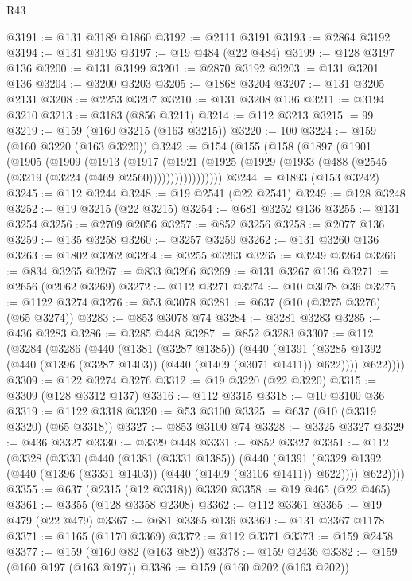 \begin{lexlean}{R43}
\begin{coremodule}
@3191 := @131 @3189 @1860
@3192 := @2111 @3191
@3193 := @2864 @3192
@3194 := @131 @3193
@3197 := @19 @484 (@22 @484)
@3199 := @128 @3197 @136
@3200 := @131 @3199
@3201 := @2870 @3192
@3203 := @131 @3201 @136
@3204 := @3200 @3203
@3205 := @1868 @3204
@3207 := @131 @3205 @2131
@3208 := @2253 @3207
@3210 := @131 @3208 @136
@3211 := @3194 @3210
@3213 := @3183 (@856 @3211)
@3214 := @112 @3213
@3215 := 99
@3219 := @159 (@160 @3215 (@163 @3215))
@3220 := 100
@3224 := @159 (@160 @3220 (@163 @3220))
@3242 := @154
    (@155
      (@158
        (@1897
          (@1901
            (@1905
              (@1909
                (@1913
                  (@1917
                    (@1921
                      (@1925 (@1929 (@1933 (@488 (@2545 (@3219 (@3224 (@469 @2560)))))))))))))))))
@3244 := @1893 (@153 @3242)
@3245 := @112 @3244
@3248 := @19 @2541 (@22 @2541)
@3249 := @128 @3248
@3252 := @19 @3215 (@22 @3215)
@3254 := @681 @3252 @136
@3255 := @131 @3254
@3256 := @2709 @2056
@3257 := @852 @3256
@3258 := @2077 @136
@3259 := @135 @3258
@3260 := @3257 @3259
@3262 := @131 @3260 @136
@3263 := @1802 @3262
@3264 := @3255 @3263
@3265 := @3249 @3264
@3266 := @834 @3265
@3267 := @833 @3266
@3269 := @131 @3267 @136
@3271 := @2656 (@2062 @3269)
@3272 := @112 @3271
@3274 := @10 @3078 @36
@3275 := @1122 @3274
@3276 := @53 @3078
@3281 := @637 (@10 (@3275 @3276) (@65 @3274))
@3283 := @853 @3078 @74
@3284 := @3281 @3283
@3285 := @436 @3283
@3286 := @3285 @448
@3287 := @852 @3283
@3307 := @112
    (@3284
      (@3286
        (@440
          (@1381 (@3287 @1385))
          (@440
            (@1391 (@3285 @1392 (@440 (@1396 (@3287 @1403)) (@440 (@1409 (@3071 @1411)) @622))))
            @622))))
@3309 := @122 @3274 @3276
@3312 := @19 @3220 (@22 @3220)
@3315 := @3309 (@128 @3312 @137)
@3316 := @112 @3315
@3318 := @10 @3100 @36
@3319 := @1122 @3318
@3320 := @53 @3100
@3325 := @637 (@10 (@3319 @3320) (@65 @3318))
@3327 := @853 @3100 @74
@3328 := @3325 @3327
@3329 := @436 @3327
@3330 := @3329 @448
@3331 := @852 @3327
@3351 := @112
    (@3328
      (@3330
        (@440
          (@1381 (@3331 @1385))
          (@440
            (@1391 (@3329 @1392 (@440 (@1396 (@3331 @1403)) (@440 (@1409 (@3106 @1411)) @622))))
            @622))))
@3355 := @637 (@2315 (@12 @3318)) @3320
@3358 := @19 @465 (@22 @465)
@3361 := @3355 (@128 @3358 @2308)
@3362 := @112 @3361
@3365 := @19 @479 (@22 @479)
@3367 := @681 @3365 @136
@3369 := @131 @3367 @1178
@3371 := @1165 (@1170 @3369)
@3372 := @112 @3371
@3373 := @159 @2458
@3377 := @159 (@160 @82 (@163 @82))
@3378 := @159 @2436
@3382 := @159 (@160 @197 (@163 @197))
@3386 := @159 (@160 @202 (@163 @202))

\end{coremodule}
\end{lexlean}
